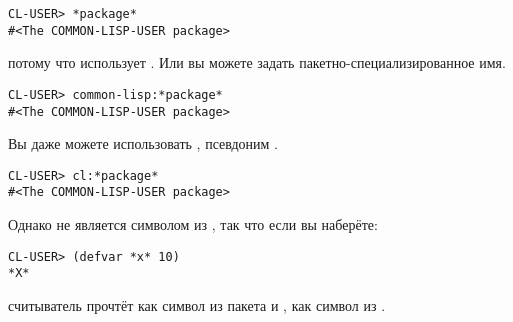 \begin{lstlisting}
CL-USER> *package*
#<The COMMON-LISP-USER package>
\end{lstlisting}

\noindent{}потому что  использует . Или вы можете задать
пакетно-специализированное имя.

\begin{lstlisting}
CL-USER> common-lisp:*package*
#<The COMMON-LISP-USER package>
\end{lstlisting}

Вы даже можете использовать , псевдоним .

\begin{lstlisting}
CL-USER> cl:*package*
#<The COMMON-LISP-USER package>
\end{lstlisting}

Однако  не является символом из , так что если вы наберёте:

\begin{lstlisting}
CL-USER> (defvar *x* 10)
*X*
\end{lstlisting}

\noindent{}считыватель прочтёт  как символ из пакета  и ,
как символ из .

